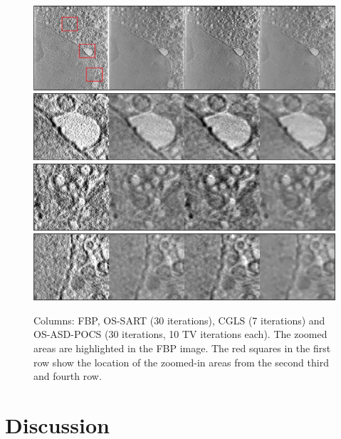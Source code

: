 \begin{figure}
\begin{center}

\includegraphics[width=\textwidth]{Applications/Diamond5.png} 
\includegraphics[width=\textwidth]{Applications/Diamond5zoom1.png} 
\includegraphics[width=\textwidth]{Applications/Diamond5zoom2.png} 
\includegraphics[width=\textwidth]{Applications/Diamond5zoom3.png} 

\end{center}

\caption[Cell image recosntructed with different algorithms 3]{\label{fig:Diamond3} Columns: FBP, OS-SART (30 iterations), CGLS (7 iterations) and OS-ASD-POCS (30 iterations, 10 TV iterations each). The zoomed areas are highlighted in the FBP image. The red squares in the first row show the location of the zoomed-in areas from the second third and fourth row.} 
\end{figure}
\FloatBarrier
\section{Discussion}